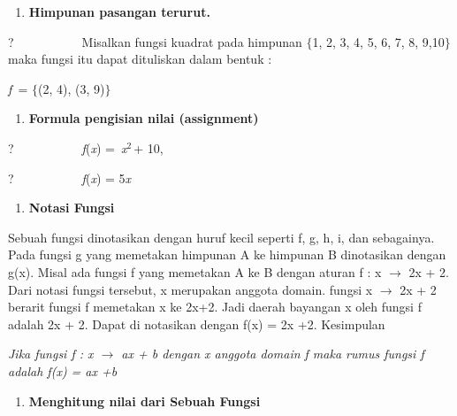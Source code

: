 \documentclass[11pt,fleqn]{book} %
\begin{document}
\begin{myEnumerate}
\begin{itemize}
\noindent \textbf{}

\begin{enumerate}
\item \textbf{ Himpunan pasangan terurut.}
\end{enumerate}

\noindent 

\noindent ?~~~~~~~~~~~Misalkan fungsi kuadrat pada himpunan $\{$1, 2, 3, 4, 5, 6, 7, 8, 9,10$\}$ maka fungsi itu dapat dituliskan dalam bentuk :

\noindent \textit{f~}= $\{$(2, 4), (3, 9)$\}$

\noindent 

\begin{enumerate}
\item  \textbf{Formula pengisian nilai (assignment)}
\end{enumerate}

\noindent \textbf{}

\noindent ?~~~~~~~~~~~\textit{f}(\textit{x}) =~\textit{x}${}^{2~}$+ 10,

\noindent 

\noindent ?~~~~~~~~~~~\textit{f}(\textit{x}) = 5\textit{x}

\noindent \textit{}

\begin{enumerate}
\item \textit{ }\textbf{ Notasi Fungsi}
\end{enumerate}

\noindent 

\noindent Sebuah fungsi dinotasikan dengan huruf kecil seperti f, g, h, i, dan sebagainya. Pada fungsi g yang memetakan himpunan A ke himpunan B dinotasikan dengan g(x). Misal ada fungsi f yang memetakan A ke B dengan aturan f : x $\mathrm{\to}$ 2x + 2. Dari notasi fungsi tersebut, x merupakan anggota domain. fungsi x $\mathrm{\to}$ 2x + 2 berarit fungsi f memetakan x ke 2x+2. Jadi daerah bayangan x oleh fungsi f adalah 2x + 2. Dapat di notasikan dengan f(x) = 2x +2. Kesimpulan

\noindent 

\noindent \textit{Jika fungsi f : x $\to$ ax + b dengan x anggota domain f maka rumus fungsi f adalah f(x) = ax +b}

\noindent \textit{}

\begin{enumerate}
\item \textit{ }\textbf{Menghitung nilai dari Sebuah Fungsi}
\end{enumerate}


\end{itemize}
\end{myEnumerate}
\end{document}
